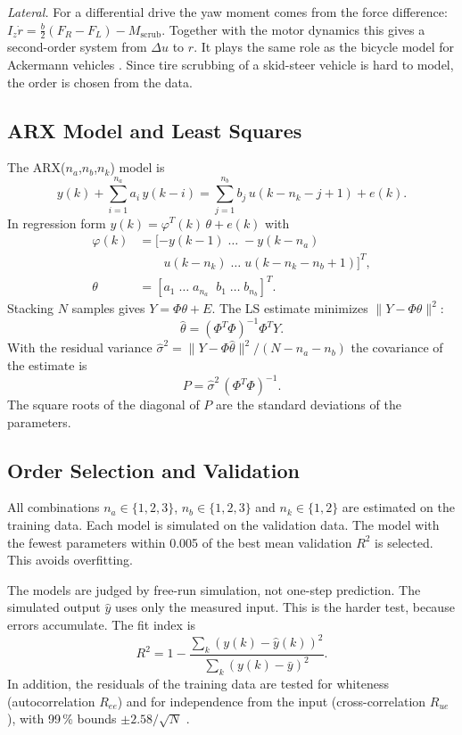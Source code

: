 \documentclass[conference]{IEEEtran}
\begin{document}
\emph{Lateral.} For a differential drive the yaw moment comes from the
force difference: $I_z \dot r = \tfrac{b}{2}(F_R - F_L) - M_{\mathrm{scrub}}$.
Together with the motor dynamics this gives a second-order system from
$\Delta u$ to $r$. It plays the same role as the bicycle model for
Ackermann vehicles \cite{rajamani}. Since tire scrubbing of a skid-steer
vehicle is hard to model, the order is chosen from the data.

\subsection{ARX Model and Least Squares}
The ARX($n_a$,$n_b$,$n_k$) model is \cite{ljung}
\begin{equation}
y(k) + \sum_{i=1}^{n_a} a_i\, y(k-i) = \sum_{j=1}^{n_b} b_j\, u(k-n_k-j+1) + e(k).
\end{equation}
In regression form $y(k) = \varphi^{T}(k)\,\theta + e(k)$ with
\begin{align}
\varphi(k) &= [-y(k-1)\; \dots\; -y(k-n_a) \nonumber\\
           &\qquad u(k-n_k)\; \dots\; u(k-n_k-n_b+1)]^{T}, \nonumber\\
\theta &= [a_1\; \dots\; a_{n_a}\;\; b_1\; \dots\; b_{n_b}]^{T}.
\end{align}
Stacking $N$ samples gives $Y = \Phi\theta + E$. The LS estimate minimizes
$\|Y - \Phi\theta\|^2$:
\begin{equation}
\hat\theta = (\Phi^{T}\Phi)^{-1}\Phi^{T} Y .
\label{eq:ls}
\end{equation}
With the residual variance
$\hat\sigma^2 = \|Y - \Phi\hat\theta\|^2/(N - n_a - n_b)$ the covariance of
the estimate is \cite{soderstrom}
\begin{equation}
P = \hat\sigma^2\,(\Phi^{T}\Phi)^{-1}.
\label{eq:cov}
\end{equation}
The square roots of the diagonal of $P$ are the standard deviations of the
parameters.

\subsection{Order Selection and Validation}
All combinations $n_a \in \{1,2,3\}$, $n_b \in \{1,2,3\}$ and
$n_k \in \{1,2\}$ are estimated on the training data. Each model is
simulated on the validation data. The model with the fewest parameters
within 0.005 of the best mean validation $R^2$ is selected. This avoids
overfitting.

The models are judged by free-run simulation, not one-step prediction.
The simulated output $\hat y$ uses only the measured input. This is the
harder test, because errors accumulate. The fit index is
\begin{equation}
R^2 = 1 - \frac{\sum_k (y(k) - \hat y(k))^2}{\sum_k (y(k) - \bar y)^2}.
\label{eq:r2}
\end{equation}
In addition, the residuals of the training data are tested for whiteness
(autocorrelation $R_{ee}$) and for independence from the input
(cross-correlation $R_{ue}$), with 99\,\% bounds $\pm 2.58/\sqrt N$
\cite{ljung}.
\end{document}
